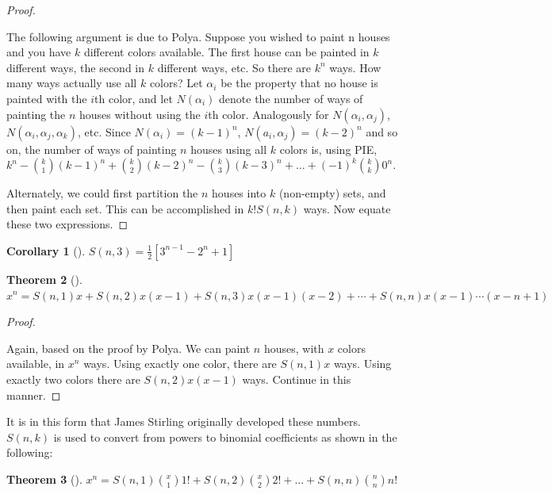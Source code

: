 \documentclass[10pt,]{book}
\theoremstyle{plain}
\newtheorem{theorem}{Theorem}[section]
\newtheorem{corollary}[theorem]{Corollary}
\theoremstyle{definition}
\theoremstyle{definition}
\theoremstyle{definition}
\theoremstyle{definition}
\numberwithin{equation}{chapter}
\begin{document}
\begin{proof}\hypertarget{proof-12}{}
\hypertarget{p-1082}{}%
The following argument is due to Polya. Suppose you wished to paint n houses and you have \(k\) different colors available. The first house can be painted in \(k\) different ways, the second in \(k\) different ways, etc. So there are \(k^{n}\) ways. How many ways actually use all \(k\) colors? Let \(\alpha_{i}\) be the property that no house is painted with the \(i\)th color, and let \(N(\alpha_{i})\) denote the number of ways of painting the \(n\) houses without using the \(i\)th color. Analogously for \(N(\alpha_{i},\alpha_{j})\), \(N(\alpha_{i},\alpha_{j},\alpha_{k})\), etc. Since \(N(\alpha_{i}) = (k - 1)^{n}\), \(N(a_{i},\alpha_{j}) = ( k - 2)^{n}\) and so on, the number of ways of painting \(n\) houses using all \(k\) colors is, using PIE, \(k^{n} -\binom{k}{1} \left(k - 1 \right)^{n} + \binom{k}{2} \left( k - 2 \right)^{n} - \binom{k}{3}      \left( k - 3 \right)^{n} + \ldots + \left( - 1 \right)^{k}\binom{k}{k} 0^{n}\).%
\par
\hypertarget{p-1083}{}%
Alternately, we could first partition the \(n\) houses into \(k\) (non-empty) sets, and then paint each set. This can be    accomplished in \(k!S(n,k)\) ways. Now equate these two expressions.%
\end{proof}
\begin{corollary}[{}]\label{corollary-1}
\hypertarget{p-1084}{}%
\(S\left( n,3 \right) = \frac{1}{2}\left\lbrack 3^{n - 1} - 2^{n} + 1 \right\rbrack\)%
\end{corollary}
\begin{theorem}[{}]\label{thm-stirling-polynomial}
\hypertarget{p-1085}{}%
\(x^{n} = S\left( n,1 \right)x + S\left( n,2 \right)x\left( x - 1 \right) + S\left( n,3 \right)x\left( x - 1 \right)\left( x - 2 \right) + \cdots
+ S\left( n,n \right)x\left( x - 1 \right)\cdots(x - n + 1)\)%
\end{theorem}
\begin{proof}\hypertarget{proof-13}{}
\hypertarget{p-1086}{}%
Again, based on the proof by Polya. We can paint \(n\) houses, with \(x\) colors available, in \(x^{n}\) ways. Using exactly one color, there are \(S\left( n,1 \right)x\) ways. Using exactly two colors there are \(S\left( n,2 \right)x(x - 1)\) ways. Continue in this manner.%
\end{proof}
\hypertarget{p-1087}{}%
It is in this form that James Stirling originally developed these numbers. \(S(n,k)\) is used to convert from powers to binomial  coefficients as shown in the following:%
\begin{theorem}[{}]\label{thm-stirling-polynomial2}
\hypertarget{p-1088}{}%
\(x^{n} = S\left( n,1 \right)\binom{x}{1}1! + S\left( n,2 \right) \binom{x}{2}2! + \ldots + S\left( n,n \right)\binom{n}{n} n!\)%
\end{theorem}
\typeout{************************************************}
\typeout{************************************************}
\end{document}
